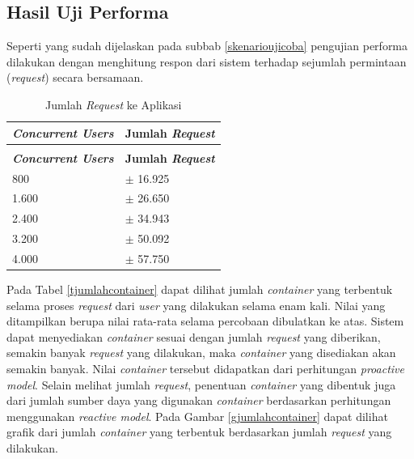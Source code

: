     \subsection{Hasil Uji Performa}
    	Seperti yang sudah dijelaskan pada subbab \ref{skenarioujicoba} pengujian performa dilakukan dengan menghitung respon dari sistem terhadap sejumlah permintaan (\textit{request}) secara bersamaan.
        \begin{longtable}{|p{}|p{}|}
        \caption{Jumlah \textit{Request} ke Aplikasi} \label{trequest} \\
            \hline
            \textbf{\textit{Concurrent Users}} & \textbf{Jumlah \textit{Request}} \\ \hline
            \endfirsthead
            \caption[]{Jumlah \textit{Request} ke Aplikasi} \\
            \hline
            \textbf{\textit{Concurrent Users}} & \textbf{Jumlah \textit{Request}} \\ \hline
            \endhead
            \endfoot
            \endlastfoot
            
            800 & $\pm$ 16.925 \\ \hline
            1.600 & $\pm$ 26.650 \\ \hline
            2.400 & $\pm$ 34.943 \\ \hline
            3.200 & $\pm$ 50.092 \\ \hline
            4.000 & $\pm$ 57.750 \\ \hline
					
		\end{longtable}
        
        Pada Tabel \ref{tjumlahcontainer} dapat dilihat jumlah \textit{container} yang terbentuk selama proses \textit{request} dari \textit{user} yang dilakukan selama enam kali. Nilai yang ditampilkan berupa nilai rata-rata selama percobaan dibulatkan ke atas. Sistem dapat menyediakan \textit{container} sesuai dengan jumlah \textit{request} yang diberikan, semakin banyak \textit{request} yang dilakukan, maka \textit{container} yang disediakan akan semakin banyak. Nilai \textit{container} tersebut didapatkan dari perhitungan \textit{proactive model}. Selain melihat jumlah \textit{request}, penentuan \textit{container} yang dibentuk juga dari jumlah sumber daya yang digunakan \textit{container} berdasarkan perhitungan menggunakan \textit{reactive model}. Pada Gambar \ref{gjumlahcontainer} dapat dilihat grafik dari jumlah \textit{container} yang terbentuk berdasarkan jumlah \textit{request} yang dilakukan.
        
